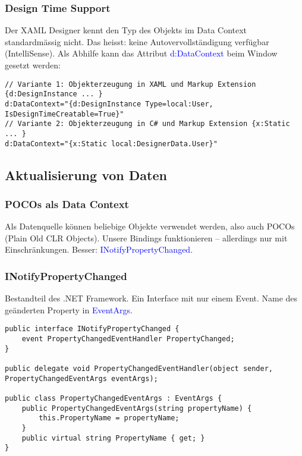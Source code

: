 \subsubsection{Design Time Support}
Der XAML Designer kennt den Typ des Objekts im Data Context standardmässig nicht. Das heisst: keine Autovervollständigung verfügbar (IntelliSense). Als Abhilfe kann das Attribut \textcolor{blue}{d:DataContext} beim Window gesetzt werden:
\begin{lstlisting}
// Variante 1: Objekterzeugung in XAML und Markup Extension {d:DesignInstance ... }
d:DataContext="{d:DesignInstance Type=local:User, IsDesignTimeCreatable=True}"
// Variante 2: Objekterzeugung in C# und Markup Extension {x:Static ... }
d:DataContext="{x:Static local:DesignerData.User}"
\end{lstlisting}
\subsection{Aktualisierung von Daten}
\subsubsection{POCOs als Data Context}
Als Datenquelle können beliebige Objekte verwendet werden, also auch POCOs (Plain Old CLR Objects). Unsere Bindings funktionieren – allerdings nur mit Einschränkungen. Besser: \textcolor{blue}{INotifyPropertyChanged}.
\subsubsection{INotifyPropertyChanged}
Bestandteil des .NET Framework. Ein Interface mit nur einem Event. Name des geänderten Property in \textcolor{blue}{EventArgs}.
\begin{lstlisting}
public interface INotifyPropertyChanged {
    event PropertyChangedEventHandler PropertyChanged;
}

public delegate void PropertyChangedEventHandler(object sender, PropertyChangedEventArgs eventArgs);

public class PropertyChangedEventArgs : EventArgs {
    public PropertyChangedEventArgs(string propertyName) {
        this.PropertyName = propertyName;
    }
    public virtual string PropertyName { get; }
}
\end{lstlisting}
